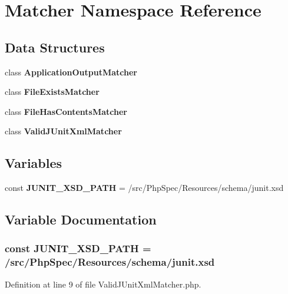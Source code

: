 \section{Matcher Namespace Reference}
\label{namespace_matcher}
\subsection*{Data Structures}
\begin{DoxyCompactItemize}
\item 
class {\bf Application\+Output\+Matcher}
\item 
class {\bf File\+Exists\+Matcher}
\item 
class {\bf File\+Has\+Contents\+Matcher}
\item 
class {\bf Valid\+J\+Unit\+Xml\+Matcher}
\end{DoxyCompactItemize}
\subsection*{Variables}
\begin{DoxyCompactItemize}
\item 
const {\bf J\+U\+N\+I\+T\+\_\+\+X\+S\+D\+\_\+\+P\+A\+T\+H} = \textquotesingle{}/src/Php\+Spec/Resources/schema/junit.\+xsd\textquotesingle{}
\end{DoxyCompactItemize}


\subsection{Variable Documentation}
\subsubsection[{J\+U\+N\+I\+T\+\_\+\+X\+S\+D\+\_\+\+P\+A\+T\+H}]{\setlength{\rightskip}{0pt plus 5cm}const J\+U\+N\+I\+T\+\_\+\+X\+S\+D\+\_\+\+P\+A\+T\+H = \textquotesingle{}/src/Php\+Spec/Resources/schema/junit.\+xsd\textquotesingle{}}\label{namespace_matcher_a76aec40ea3a8c4e51e8b4a49ec5c5c92}


Definition at line 9 of file Valid\+J\+Unit\+Xml\+Matcher.\+php.

